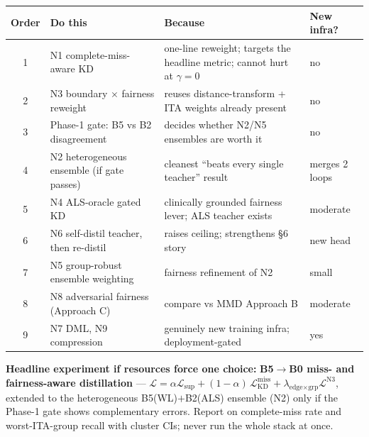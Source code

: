 \documentclass[11pt]{article}
\newcommand{\Lsup}{\mathcal{L}_{\mathrm{sup}}}
\newcommand{\novel}[1]{\textcolor{noveltygreen}{\textbf{#1}}}
\begin{document}
\begin{center}
\small
\begin{tabular}{@{}c P{5.0cm} P{4.6cm} P{2.6cm}@{}}
\toprule
Order & Do this & Because & New infra? \\
 & N1 complete-miss-aware KD & one-line reweight; targets the headline metric; cannot hurt at $\gamma{=}0$ & no \\
2 & N3 boundary $\times$ fairness reweight & reuses distance-transform + ITA weights already present & no \\
3 & Phase-1 gate: B5 vs B2 disagreement & decides whether N2/N5 ensembles are worth it & no \\
4 & N2 heterogeneous ensemble (if gate passes) & cleanest ``beats every single teacher'' result & merges 2 loops \\
5 & N4 ALS-oracle gated KD & clinically grounded fairness lever; ALS teacher exists & moderate \\
6 & N6 self-distil teacher, then re-distil & raises ceiling; strengthens \S6 story & new head \\
7 & N5 group-robust ensemble weighting & fairness refinement of N2 & small \\
8 & N8 adversarial fairness (Approach C) & compare vs MMD Approach B & moderate \\
9 & N7 DML, N9 compression & genuinely new training infra; deployment-gated & yes \\
\bottomrule
\end{tabular}
\end{center}

\begin{scopebox}
\textbf{Headline experiment if resources force one choice:}
\novel{B5$\to$B0 miss- and fairness-aware distillation} ---
$\mathcal{L} = \alpha\Lsup + (1-\alpha)\,\mathcal{L}^{\text{miss}}_{\text{KD}}
+ \lambda_{\text{edge$\times$grp}}\mathcal{L}^{\text{N3}}$, extended to the heterogeneous
B5(WL)$+$B2(ALS) ensemble (N2) only if the Phase-1 gate shows complementary errors.
Report on complete-miss rate and worst-ITA-group recall with cluster CIs; never run the whole
stack at once.
\end{scopebox}
\end{document}
